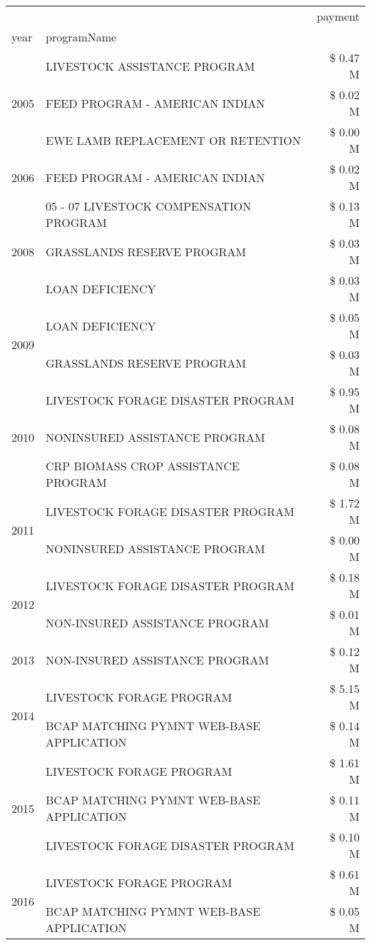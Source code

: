 \begin{tabular}{llr}
\toprule
 &  & payment \\
year & programName &  \\
\midrule
\multirow[t]{3}{*}{2005} & LIVESTOCK ASSISTANCE PROGRAM & \$ 0.47 M \\
 & FEED PROGRAM - AMERICAN INDIAN & \$ 0.02 M \\
 & EWE LAMB REPLACEMENT OR RETENTION & \$ 0.00 M \\
\cline{1-3}
2006 & FEED PROGRAM - AMERICAN INDIAN & \$ 0.02 M \\
\cline{1-3}
\multirow[t]{3}{*}{2008} & 05 - 07 LIVESTOCK COMPENSATION PROGRAM & \$ 0.13 M \\
 & GRASSLANDS RESERVE PROGRAM & \$ 0.03 M \\
 & LOAN DEFICIENCY & \$ 0.03 M \\
\cline{1-3}
\multirow[t]{2}{*}{2009} & LOAN DEFICIENCY & \$ 0.05 M \\
 & GRASSLANDS RESERVE PROGRAM & \$ 0.03 M \\
\cline{1-3}
\multirow[t]{3}{*}{2010} & LIVESTOCK FORAGE DISASTER PROGRAM & \$ 0.95 M \\
 & NONINSURED ASSISTANCE PROGRAM & \$ 0.08 M \\
 & CRP BIOMASS CROP ASSISTANCE PROGRAM & \$ 0.08 M \\
\cline{1-3}
\multirow[t]{2}{*}{2011} & LIVESTOCK FORAGE DISASTER PROGRAM & \$ 1.72 M \\
 & NONINSURED ASSISTANCE PROGRAM & \$ 0.00 M \\
\cline{1-3}
\multirow[t]{2}{*}{2012} & LIVESTOCK FORAGE DISASTER PROGRAM & \$ 0.18 M \\
 & NON-INSURED ASSISTANCE PROGRAM & \$ 0.01 M \\
\cline{1-3}
2013 & NON-INSURED ASSISTANCE PROGRAM & \$ 0.12 M \\
\cline{1-3}
\multirow[t]{2}{*}{2014} & LIVESTOCK FORAGE PROGRAM & \$ 5.15 M \\
 & BCAP MATCHING PYMNT WEB-BASE APPLICATION & \$ 0.14 M \\
\cline{1-3}
\multirow[t]{3}{*}{2015} & LIVESTOCK FORAGE PROGRAM & \$ 1.61 M \\
 & BCAP MATCHING PYMNT WEB-BASE APPLICATION & \$ 0.11 M \\
 & LIVESTOCK FORAGE DISASTER PROGRAM & \$ 0.10 M \\
\cline{1-3}
\multirow[t]{3}{*}{2016} & LIVESTOCK FORAGE PROGRAM & \$ 0.61 M \\
 & BCAP MATCHING PYMNT WEB-BASE APPLICATION & \$ 0.05 M \\

\end{tabular}
